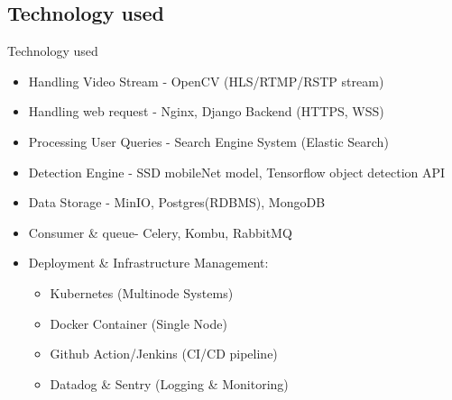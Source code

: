 \documentclass{beamer}
\begin{document}
\subsection{Technology used}
\begin{frame}{Technology used}
	\begin{itemize}
		\item Handling Video Stream - OpenCV (HLS/RTMP/RSTP stream)
		\item Handling web request - Nginx, Django Backend (HTTPS, WSS)
		\item Processing User Queries - Search Engine System (Elastic Search)
		\item Detection Engine - SSD mobileNet model, Tensorflow object detection API
		\item Data Storage - MinIO, Postgres(RDBMS), MongoDB
		\item Consumer \& queue- Celery, Kombu, RabbitMQ 
		\item Deployment \& Infrastructure Management:
		\begin{itemize}
			\item Kubernetes (Multinode Systems)
			\item Docker Container (Single Node)
			\item Github Action/Jenkins (CI/CD pipeline)
			\item Datadog \& Sentry (Logging \& Monitoring)  
		\end{itemize}
	\end{itemize}
\end{frame}
\end{document}
